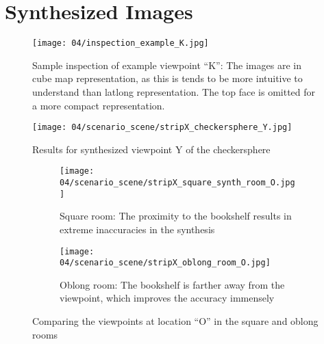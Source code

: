 \chapter{Synthesized Images}\label{imgs}

\begin{figure}
		\centering
		\texttt{[image: 04/inspection\_example\_K.jpg]}
		\caption{Sample inspection of example viewpoint ``K'': The images are in cube map representation, as this is tends to be more intuitive to understand than latlong representation. The top face is omitted for a more compact representation.}
		\label{fig:inspection_example}
\end{figure}

\begin{figure}
		\centering
    \texttt{[image: 04/scenario\_scene/stripX\_checkersphere\_Y.jpg]}
		\caption{Results for synthesized viewpoint Y of the checkersphere}
		\label{fig:scene_checkersphere_Y}
\end{figure}

\begin{figure}
\centering
    \hfill
    \begin{subfigure}[b]{\textwidth}
            \centering
            \texttt{[image: 04/scenario\_scene/stripX\_square\_synth\_room\_O.jpg]}
            \caption{Square room: The proximity to the bookshelf results in extreme inaccuracies in the synthesis}
    \end{subfigure}
    \hfill

    \hfill
    \begin{subfigure}[b]{\textwidth}
            \centering
            \texttt{[image: 04/scenario\_scene/stripX\_oblong\_room\_O.jpg]}
            \caption{Oblong room: The bookshelf is farther away from the viewpoint, which improves the accuracy immensely}
    \end{subfigure}
    \hfill
  \caption{Comparing the viewpoints at location ``O'' in the square and oblong rooms} \label{fig:scene_square_oblong_O}
\end{figure}

